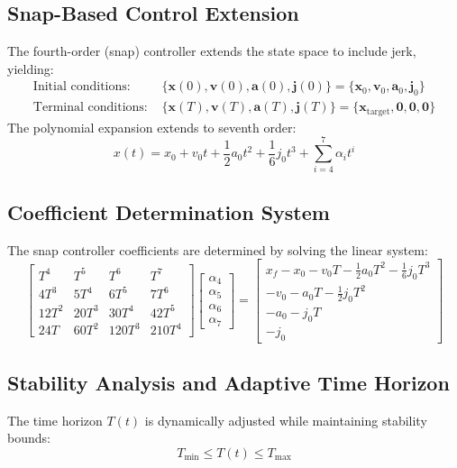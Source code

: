 \documentclass[12pt]{article}
\begin{document}
\subsection{Snap-Based Control Extension}
The fourth-order (snap) controller extends the state space to include jerk, yielding:
\begin{align*}
\text{Initial conditions: } & \{\mathbf{x}(0), \mathbf{v}(0), \mathbf{a}(0), \mathbf{j}(0)\} = \{\mathbf{x}_0, \mathbf{v}_0, \mathbf{a}_0, \mathbf{j}_0\} \\
\text{Terminal conditions: } & \{\mathbf{x}(T), \mathbf{v}(T), \mathbf{a}(T), \mathbf{j}(T)\} = \{\mathbf{x}_\text{target}, \mathbf{0}, \mathbf{0}, \mathbf{0}\}
\end{align*}
The polynomial expansion extends to seventh order:
\begin{equation}
x(t) = x_0 + v_0t + \frac{1}{2}a_0t^2 + \frac{1}{6}j_0t^3 + \sum_{i=4}^7 \alpha_i t^i
\end{equation}

\subsection{Coefficient Determination System}
The snap controller coefficients are determined by solving the linear system:
\begin{equation}
\begin{bmatrix} 
T^4 & T^5 & T^6 & T^7 \\
4T^3 & 5T^4 & 6T^5 & 7T^6 \\
12T^2 & 20T^3 & 30T^4 & 42T^5 \\
24T & 60T^2 & 120T^3 & 210T^4
\end{bmatrix} 
\begin{bmatrix}
\alpha_4 \\
\alpha_5 \\
\alpha_6 \\
\alpha_7
\end{bmatrix} = 
\begin{bmatrix}
x_f - x_0 - v_0T - \frac{1}{2}a_0T^2 - \frac{1}{6}j_0T^3 \\
-v_0 - a_0T - \frac{1}{2}j_0T^2 \\
-a_0 - j_0T \\
-j_0
\end{bmatrix}
\end{equation}

\subsection{Stability Analysis and Adaptive Time Horizon}
The time horizon $T(t)$ is dynamically adjusted while maintaining stability bounds:
\begin{equation}
T_\text{min} \leq T(t) \leq T_\text{max}
\end{equation}
\end{document}
